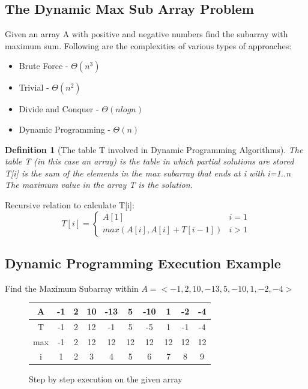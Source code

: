 \documentclass[12pt,letterpaper]{article}
\newtheorem{definition}{Definition}[section]
\begin{document}
\subsection{The Dynamic Max Sub Array Problem}
Given an array A with positive and negative numbers find the subarray with maximum sum. Following are the complexities of various types of approaches:
\begin{itemize}
\item Brute Force - $\Theta(n^3)$
\item Trivial - $\Theta(n^2)$
\item Divide and Conquer - $\Theta(nlogn)$
\item Dynamic Programming - $\Theta(n)$
\end{itemize}
\begin{definition}[The table T involved in Dynamic Programming Algorithms]\hfill \break
The table T (in this case an array) is the table in which partial solutions are stored \\
T[i] is the sum of the elements in the max subarray that ends at i with i=1..n \\
The maximum value in the array T is the solution.
\end{definition}
Recursive relation to calculate T[i]:\\
\[T[i]=\begin{cases}A[1] & i=1 \\ max(A[i], A[i]+T[i-1]) & i>1\end{cases}\]
\subsection{Dynamic Programming Execution Example}
Find the Maximum Subarray within $A=<-1, 2, 10, -13, 5, -10, 1, -2, -4>$
\begin{figure}[h]
\centering
\begin{tabular}{|c|c|c|c|c|c|c|c|c|c|}
\hline
A & -1 & 2 & 10 & -13 & 5 & -10 & 1 & -2 & -4 \\
\hline 
T & -1 & 2 & 12 & -1 & 5 & -5 & 1 & -1 & -4 \\
\hline
max & -1 & 2 & 12 & 12 & 12 & 12 & 12 & 12 & 12 \\
\hline
i & 1 & 2 & 3 & 4 & 5 & 6 & 7 & 8 & 9 \\
\hline
\end{tabular}
\caption{Step by step execution on the given array}
\end{figure}
\end{document}
